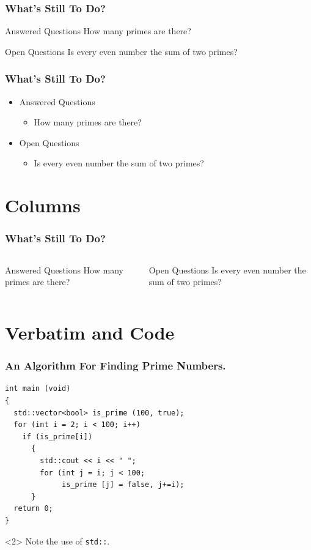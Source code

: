 \documentclass{beamer}
\begin{document}
\begin{frame}
  \frametitle{What’s Still To Do?}
  \begin{block}{Answered Questions}
    How many primes are there?
  \end{block}
  \begin{alertblock}{Open Questions}
    Is every even number the sum of two primes?
  \end{alertblock}
\end{frame}

\begin{frame}
  \frametitle{What’s Still To Do?}
  \begin{itemize}
  \item Answered Questions
    \begin{itemize}
    \item How many primes are there?
    \end{itemize}
  \item Open Questions
    \begin{itemize}
    \item Is every even number the sum of two primes?
    \end{itemize}
  \end{itemize}
\end{frame}

\section{Columns}
\begin{frame}
  \frametitle{What’s Still To Do?}
  \begin{columns}
    \begin{block}{Answered Questions}
      How many primes are there?
    \end{block}
    \begin{block}{Open Questions}
      Is every even number the sum of two primes?
    \end{block}
  \end{columns}
\end{frame}

\section{Verbatim and Code}
\begin{frame}[fragile]          %
  \frametitle{An Algorithm For Finding Prime Numbers.}
\begin{verbatim}
int main (void)
{
  std::vector<bool> is_prime (100, true);
  for (int i = 2; i < 100; i++)
    if (is_prime[i])
      {
        std::cout << i << " ";
        for (int j = i; j < 100;
             is_prime [j] = false, j+=i);
      }
  return 0;
}
\end{verbatim}
  \begin{uncoverenv}<2>
    Note the use of \verb|std::|.
  \end{uncoverenv}
\end{frame}
\end{document}
